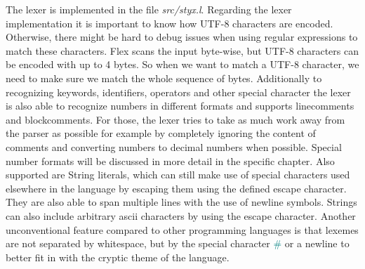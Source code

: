The lexer is implemented in the file \textit{src/styx.l}. Regarding the
lexer implementation it is important to know how UTF-8 characters are
encoded. Otherwise, there might be hard to debug issues when using
regular expressions to match these characters. Flex scans the input byte-wise,
but UTF-8 characters can be encoded with up to 4 bytes. So when we want to match
a UTF-8 character, we need to make sure we match the whole sequence of bytes.
\newline
Additionally to recognizing keywords, identifiers, operators and other special 
character the lexer is also able to recognize numbers in different formats and
supports linecomments and blockcomments. For those, the lexer tries to take as
much work away from the parser as possible for example by completely
ignoring the content of comments and converting numbers to decimal numbers when
possible. Special number formats will be discussed in more detail in the specific chapter.
\newline
Also supported are String literals, which can still make use of special characters
used elsewhere in the language by escaping them using the defined escape character.
They are also able to span multiple lines with the use of newline symbols.
Strings can also include arbitrary ascii characters by using the escape character.
\newline
Another unconventional feature compared to other programming languages
is that lexemes are not separated by whitespace,
but by the special character \textcolor{teal}{\#} or a newline
to better fit in with the cryptic theme of the language. 